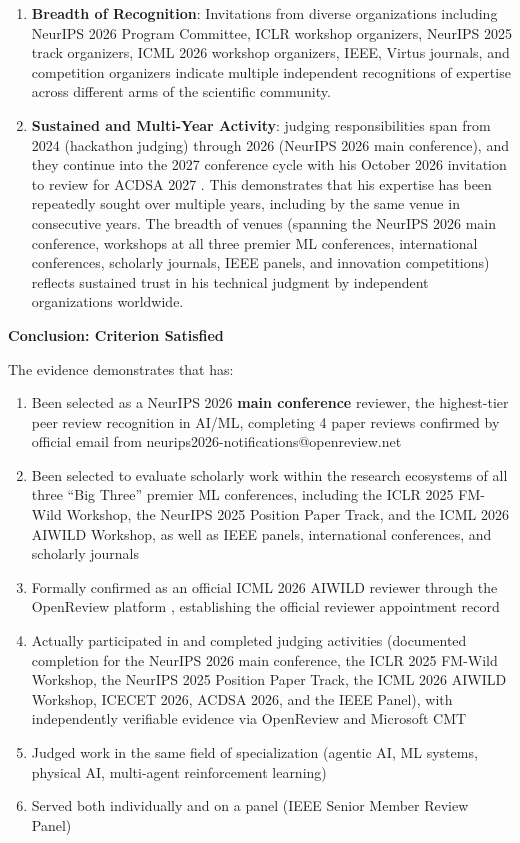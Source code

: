 \begin{enumerate}
    \item \textbf{Breadth of Recognition}: Invitations from diverse organizations including NeurIPS 2026 Program Committee, ICLR workshop organizers, NeurIPS 2025 track organizers, ICML 2026 workshop organizers, IEEE, Virtus journals, and competition organizers indicate multiple independent recognitions of expertise across different arms of the scientific community.

    \item \textbf{Sustained and Multi-Year Activity}: \drs judging responsibilities span from 2024 (hackathon judging) through 2026 (NeurIPS 2026 main conference), and they continue into the 2027 conference cycle with his October 2026 invitation to review for ACDSA 2027 \cite{JR46}. This demonstrates that his expertise has been repeatedly sought over multiple years, including by the same venue in consecutive years. The breadth of venues (spanning the NeurIPS 2026 main conference, workshops at all three premier ML conferences, international conferences, scholarly journals, IEEE panels, and innovation competitions) reflects sustained trust in his technical judgment by independent organizations worldwide.
\end{enumerate}

\textbf{Conclusion: Criterion Satisfied}

The evidence demonstrates that \dr has:

\begin{enumerate}
    \item [$\checkmark$] Been selected as a NeurIPS 2026 \textbf{main conference} reviewer, the highest-tier peer review recognition in AI/ML, completing 4 paper reviews confirmed by official email from neurips2026-notifications@openreview.net \cite{JR39,JR41,JR43,JR45}
    \item [$\checkmark$] Been selected to evaluate scholarly work within the research ecosystems of all three ``Big Three'' premier ML conferences, including the ICLR 2025 FM-Wild Workshop, the NeurIPS 2025 Position Paper Track, and the ICML 2026 AIWILD Workshop, as well as IEEE panels, international conferences, and scholarly journals
    \item [$\checkmark$] Formally confirmed as an official ICML 2026 AIWILD reviewer through the OpenReview platform \cite{JR37}, establishing the official reviewer appointment record
    \item [$\checkmark$] Actually participated in and completed judging activities (documented completion for the NeurIPS 2026 main conference, the ICLR 2025 FM-Wild Workshop, the NeurIPS 2025 Position Paper Track, the ICML 2026 AIWILD Workshop, ICECET 2026, ACDSA 2026, and the IEEE Panel), with independently verifiable evidence via OpenReview and Microsoft CMT
    \item [$\checkmark$] Judged work in the same field of specialization (agentic AI, ML systems, physical AI, multi-agent reinforcement learning)
    \item [$\checkmark$] Served both individually and on a panel (IEEE Senior Member Review Panel)
\end{enumerate}

